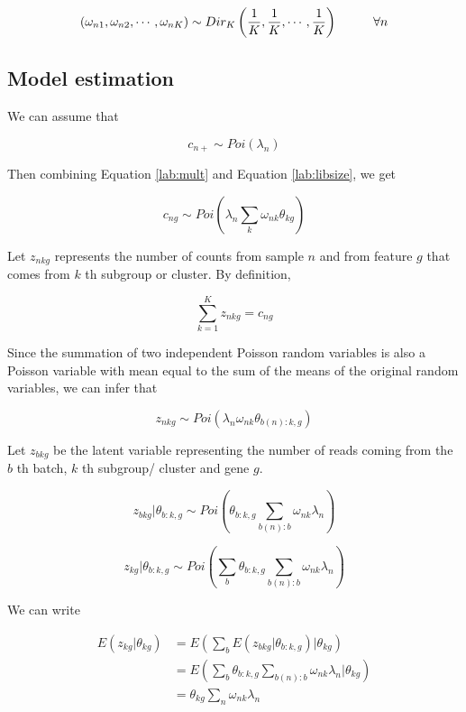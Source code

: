 \documentclass[]{article}
\begin{document}
\[ (\omega_{n1}, \omega_{n2}, \cdots, \omega_{nK}) \sim  Dir_{K} \left ( \frac{1}{K}, \frac{1}{K}, \cdots, \frac{1}{K} \right) \hspace{1 cm} \forall n\]

\subsection{Model estimation}\label{model-estimation}

We can assume that

\begin{equation}
c_{n+} \sim Poi(\lambda_{n}) 
\label{lab:libsize}
\end{equation}

Then combining Equation \ref{lab:mult} and Equation \ref{lab:libsize},
we get

\begin{equation}
c_{ng} \sim Poi \left ( \lambda_{n} \sum_{k} \omega_{nk} \theta_{kg} \right)
\end{equation}

Let \(z_{nkg}\) represents the number of counts from sample \(n\) and
from feature \(g\) that comes from \(k\) th subgroup or cluster. By
definition,

\[ \sum_{k=1}^{K} z_{nkg} = c_{ng}  \]

Since the summation of two independent Poisson random variables is also
a Poisson variable with mean equal to the sum of the means of the
original random variables, we can infer that

\[ z_{nkg} \sim Poi \left (\lambda_{n}\omega_{nk} \theta_{b(n):k,g} \right ) \]

Let \(z_{bkg}\) be the latent variable representing the number of reads
coming from the \(b\) th batch, \(k\) th subgroup/ cluster and gene
\(g\).

\[ z_{bkg} | \theta_{b:k,g} \sim Poi \left (\theta_{b:k,g} \sum_{b(n):b} \omega_{nk}\lambda_{n} \right )  \]

\[ z_{kg} | \theta_{b:k,g} \sim Poi \left (\sum_{b} \theta_{b:k,g} \sum_{b(n):b} \omega_{nk}\lambda_{n} \right ) \]

We can write

\begin{align*}
E(z_{kg} | \theta_{kg}) & = E \left ( \sum_{b} E \left ( z_{bkg} | \theta_{b:k,g} \right)| \theta_{kg} \right ) \\
                        & = E \left ( \sum_{b} \theta_{b:k,g} \sum_{b(n):b} \omega_{nk} \lambda_{n} |  \theta_{kg} \right) \\
                        & = \theta_{kg} \sum_{n} \omega_{nk} \lambda_{n} 
\end{align*}
\end{document}
